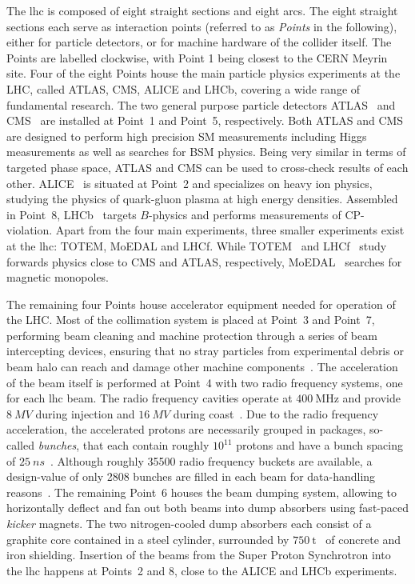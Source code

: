 The \gls{lhc} is composed of eight straight sections and eight arcs. The eight straight sections each serve as interaction points (referred to as \textit{Points} in the following), either for particle detectors, or for machine hardware of the collider itself.
The Points are labelled clockwise, with Point 1 being closest to the CERN Meyrin site.
Four of the eight Points house the main particle physics experiments at the LHC, called ATLAS, CMS, ALICE and LHCb, covering a wide range of fundamental research.
The two general purpose particle detectors ATLAS~\cite{Aad:2008zzm} and CMS~\cite{Chatrchyan:2008aa} are installed at Point~1 and Point~5, respectively.
Both ATLAS and CMS are designed to perform high precision SM measurements including Higgs measurements as well as searches for BSM physics. Being very similar in terms of targeted phase space, ATLAS and CMS can be used to cross-check results of each other.
ALICE~\cite{Aamodt:2008zz} is situated at Point~2 and specializes on heavy ion physics, studying the physics of quark-gluon plasma at high energy densities. Assembled in Point~8, LHCb~\cite{Alves:2008zz} targets $B$-physics and performs measurements of CP-violation.
Apart from the four main experiments, three smaller experiments exist at the \gls{lhc}: TOTEM, MoEDAL and LHCf.
While TOTEM~\cite{Anelli:2008zza} and LHCf~\cite{Adriani:2006jd} study forwards physics close to CMS and ATLAS, respectively, MoEDAL~\cite{Pinfold:2009oia} searches for magnetic monopoles.

The remaining four Points house accelerator equipment needed for operation of the LHC.
Most of the collimation system is placed at Point~3 and Point~7, performing beam cleaning and machine protection through a series of beam intercepting devices, ensuring that no stray particles from experimental debris or beam halo can reach and damage other machine components~\cite{Bruning:782076}.
The acceleration of the beam itself is performed at Point~4 with two radio frequency systems, one for each \gls{lhc} beam. The radio frequency cavities operate at $\SI{400}{\MHz}$ and provide $\SI{8}{MV}$ during injection and $\SI{16}{MV}$ during coast~\cite{Bruning:782076}.
Due to the radio frequency acceleration, the accelerated protons are necessarily grouped in packages, so-called \textit{bunches}, that each contain roughly $10^{11}$ protons and have a bunch spacing of $\SI{25}{ns}$~\cite{Bruning:782076}. Although roughly \num[group-separator={,}]{35500} radio frequency buckets are available, a design-value of only 2808 bunches are filled in each beam for data-handling reasons~\cite{Bruning:782076}.
The remaining Point~6 houses the beam dumping system, allowing to horizontally deflect and fan out both beams into dump absorbers using fast-paced \textit{kicker} magnets.
The two nitrogen-cooled dump absorbers each consist of a graphite core contained in a steel cylinder, surrounded by $\SI{750}{\tonne}$~\cite{Bruning:782076} of concrete and iron shielding.
Insertion of the beams from the Super Proton Synchrotron into the \gls{lhc} happens at Points~2 and 8, close to the ALICE and LHCb experiments.

